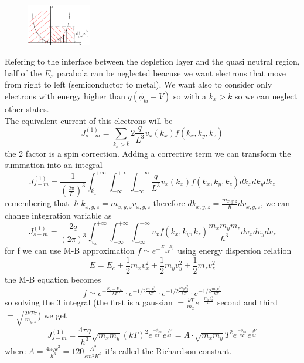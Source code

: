 \begin{figure}
\includegraphics[width=0.25\textwidth]{bethe.png}
\end{figure}

Refering to the interface between the depletion layer and the quasi neutral region, half of the $E_x$ parabola can be neglected beacuse we want electrons that move from right to left (semiconductor to metal). We want also to consider only electrons with energy higher than $q(\phi_{bi}-V)$ so with a $k_x>\overline{k}$ so we can neglect other states.\\
The equivalent current of this electrons will be 
\begin{equation}
J_{s-m}^{(1)}=\sum_{k_x>\overline{k}}2 \frac{q}{L^3}v_x(k_x)f(k_x,k_y,k_z)
\end{equation}
the 2 factor is a spin correction. Adding a corrective term we can transform the summation into an integral 
\begin{equation}
J_{s-m}^{(1)}=\frac{1}{(\frac{2\pi}{L})^3}\int_{\overline{k_x}}^{+\infty}\int_{-\infty}^{+\infty}\int_{-\infty}^{+\infty}\frac{q}{L^3}v_x(k_x)f(k_x,k_y,k_z)dk_xdk_ydk_z
\end{equation}
remembering that $\hslash k_{x,y,z}=m_{x,y,z}v_{x,y,z}$ therefore $dk_{x,y,z}=\frac{m_{x,y,z}}{\hslash}dv_{x,y,z}$, we can change integration variable as 
\begin{equation}
J_{s-m}^{(1)}=\frac{2q}{(2\pi)^3}\int^{+\infty}_{v_x}\int_{-\infty}^{+\infty}\int_{-\infty}^{+\infty}v_xf(k_x,k_y,k_z) \frac{m_xm_ym_z}{\hslash^3} dv_xdv_ydv_z
\end{equation}
for f we can use M-B approximation $f\simeq e^{-\frac{E-E_f}{kT}}$ using energy dispersion relation 
\begin{equation}
E=E_c+\frac{1}{2}m_xv_x^2+\frac{1}{2}m_yv_y^2+\frac{1}{2}m_zv_z^2
\end{equation}
the M-B equation becomes
\begin{equation}
f\simeq e^{-\frac{E_c-E_{fn}}{kT}}\cdot e^{-1/2\frac{m_xv_x^2}{kT}}\cdot e^{-1/2\frac{m_yv_y^2}{kT}}\cdot e^{-1/2\frac{m_zv_z^2}{kT}}
\end{equation}
so solving the 3 integral (the first is a gaussian $=\frac{kT}{m_x}e^{-\frac{m_xv_x^2}{kT}}$ second and third $=\sqrt{\frac{2kT\pi}{m_{y,z}}}$) we get 
\begin{equation}
J_{s-m}^{(1)}=\frac{4\pi q}{h^3}\sqrt{m_xm_y}(kT)^2e^{\frac{-\phi_{bn}}{kT}}e^{\frac{qV}{kT}}=A\cdot\sqrt{m_xm_y}T^2e^{\frac{-\phi_{bn}}{kT}}e^{\frac{qV}{kT}}
\end{equation}
where $A=\frac{4\pi qk^2}{h^3}=120 \frac{A^2}{cm^2 K^2}$ it's called the Richardson constant.\\

